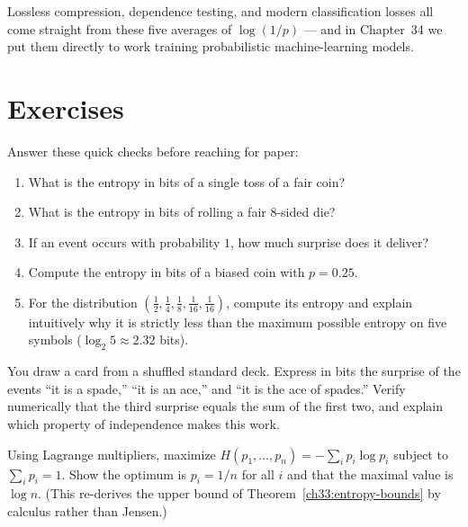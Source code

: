 Lossless compression, dependence testing, and modern classification losses all come straight
from these five averages of $\log(1/p)$ --- and in Chapter~34 we put them directly to work
training probabilistic machine-learning models.

\section{Exercises}
\label{ch33:exercises}

\begin{exercise}
\label{ch33:ex-warmup}
Answer these quick checks before reaching for paper:
\begin{enumerate}[label=(\alph*)]
  \item What is the entropy in bits of a single toss of a fair coin?
  \item What is the entropy in bits of rolling a fair $8$-sided die?
  \item If an event occurs with probability $1$, how much surprise does it deliver?
  \item Compute the entropy in bits of a biased coin with $p=0.25$.
  \item For the distribution $(\tfrac12, \tfrac14, \tfrac18, \tfrac1{16}, \tfrac1{16})$, compute its entropy and explain intuitively why it is strictly less than the maximum possible entropy on five symbols ($\log_2 5 \approx 2.32$ bits).
\end{enumerate}
\end{exercise}

\begin{exercise}
\label{ch33:ex-surprise-adds}
You draw a card from a shuffled standard deck. Express in bits the surprise of the events ``it is a
spade,'' ``it is an ace,'' and ``it is the ace of spades.'' Verify numerically that the third surprise
equals the sum of the first two, and explain which property of independence makes this work.
\end{exercise}

\begin{exercise}
\label{ch33:ex-max-uniform}
Using Lagrange multipliers, maximize $H(p_1,\dots,p_n) = -\sum_i p_i\log p_i$ subject to $\sum_i p_i = 1$.
Show the optimum is $p_i = 1/n$ for all $i$ and that the maximal value is $\log n$. (This re-derives the
upper bound of Theorem~\ref{ch33:entropy-bounds} by calculus rather than Jensen.)
\end{exercise}

